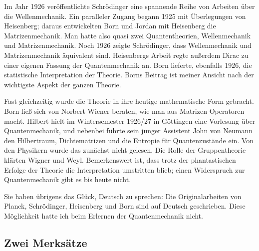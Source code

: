\begin{vertiefung}
  Im Jahr 1926 veröffentlichte Schrödinger eine spannende Reihe von Arbeiten über die
  Wellenmechanik. Ein paralleler Zugang begann 1925 mit Überlegungen von Heisenberg; daraus
  entwickelten Born und Jordan mit Heisenberg die Matrizenmechanik. Man hatte also quasi zwei
  Quantentheorien, Wellenmechanik und Matrizenmechanik. Noch 1926 zeigte Schrödinger, dass
  Wellenmechanik und Matrizenmechanik äquivalent sind. Heisenbergs Arbeit regte außerdem
  Dirac zu einer eigenen Fassung der Quantenmechanik an. Born lieferte, ebenfalls 1926, die
  statistische Interpretation der Theorie. Borns Beitrag ist
  meiner Ansicht nach der wichtigste Aspekt der ganzen Theorie.

  Fast gleichzeitig wurde die Theorie in ihre heutige mathematische Form gebracht. Born ließ
  sich von Norbert Wiener beraten, wie man aus Matrizen Operatoren macht. Hilbert hielt im
  Wintersemester 1926/27 in Göttingen eine Vorlesung über Quantenmechanik, und nebenbei
  führte sein junger Assistent John von Neumann den Hilbertraum, Dichtematrizen und die
  Entropie für Quantenzustände ein. Von den Physikern wurde das zunächst nicht gelesen. Die
  Rolle der Gruppentheorie klärten Wigner und Weyl. Bemerkenswert ist, dass trotz der
  phantastischen Erfolge der Theorie die Interpretation umstritten blieb; einen Widerspruch
  zur Quantenmechanik gibt es bis heute nicht.

  \begin{historical}
    Sie haben übrigens das Glück, Deutsch zu sprechen: Die Originalarbeiten von Planck,
    Schrödinger, Heisenberg und Born sind auf Deutsch geschrieben. Diese Möglichkeit hatte
    ich beim Erlernen der Quantenmechanik nicht.
  \end{historical}
\end{vertiefung}

\subsection{Zwei Merksätze}\label{c00.s4.4}

